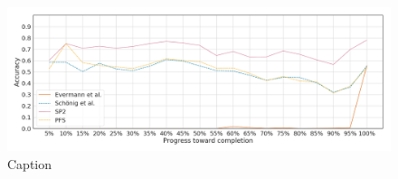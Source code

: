 \begin{figure}[!htb]
    \centering
    \includegraphics[width=\textwidth]{gfx/bpic2015_3/windowed_stability.png}
    \caption{Caption}
    \label{fig:my_label}
\end{figure}